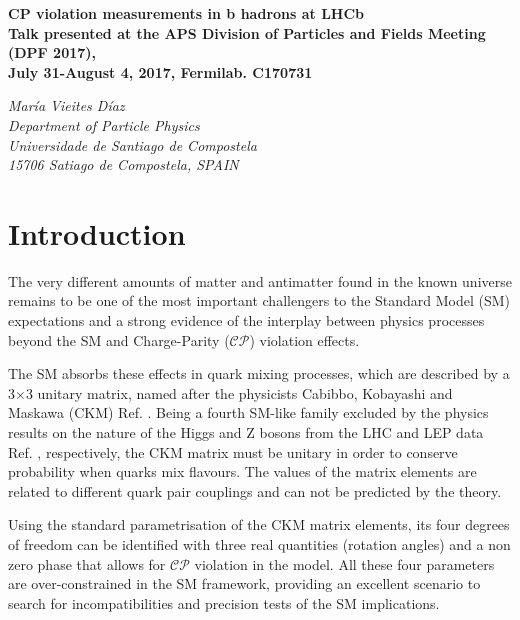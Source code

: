\documentclass[12pt]{article}
\def\Title#1{\begin{center} {\Large {\bf #1} } \end{center}}
\begin{document}
\Title{CP violation measurements in b hadrons at LHCb \\
\vspace{0.4cm}
\footnotesize{Talk presented at the APS Division of Particles and Fields Meeting (DPF 2017),\\ July 31-August 4, 2017, Fermilab. C170731}}

\bigskip\bigskip


\begin{raggedright}  

{\it Mar\'ia Vieites D\'iaz\\
Department of Particle Physics\\
Universidade de Santiago de Compostela\\
15706 Satiago de Compostela, SPAIN}
\bigskip\bigskip
\end{raggedright}



\section{Introduction}
The very different amounts of matter and antimatter found in the known universe remains to be one of the most important challengers to the Standard Model (SM) expectations and a strong evidence of the interplay between physics processes beyond the SM and Charge-Parity ($\mathcal{CP}$) violation effects. 

The SM absorbs these effects in quark mixing processes, which are described by a 3$\times$3 unitary matrix, named after the physicists Cabibbo, Kobayashi and Maskawa (CKM) Ref. \cite{ckm,ckm2}. Being a fourth SM-like family excluded by the physics results on the nature of the Higgs and Z bosons from the LHC and LEP data Ref. \cite{fourthfamily}, respectively, the CKM matrix must be unitary in order to conserve probability when quarks mix flavours. The values of the matrix elements are related to different quark pair couplings and can not be predicted by the theory. 

Using the standard parametrisation of the CKM matrix elements, its four degrees of freedom can be identified with three real quantities (rotation angles) and a non zero phase that allows for $\mathcal{CP}$ violation in the model. All these four parameters are over-constrained in the SM framework, providing an excellent scenario to search for incompatibilities and precision tests of the SM implications.
\end{document}
